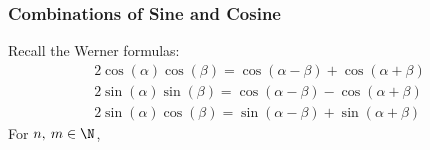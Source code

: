 \documentclass{article}
\begin{document}
\subsubsection{Combinations of Sine and Cosine}
Recall the Werner formulas:
\begin{gather*}
    2 \cos{\left( \alpha \right)} \cos{\left( \beta \right)} = \cos{\left( \alpha - \beta \right)} + \cos{\left( \alpha + \beta \right)} \\
    2 \sin{\left( \alpha \right)} \sin{\left( \beta \right)} = \cos{\left( \alpha - \beta \right)} - \cos{\left( \alpha + \beta \right)} \\
    2 \sin{\left( \alpha \right)} \cos{\left( \beta \right)} = \sin{\left( \alpha - \beta \right)} + \sin{\left( \alpha + \beta \right)}
\end{gather*}
For \(n,\: m \in \N\),
\end{document}

